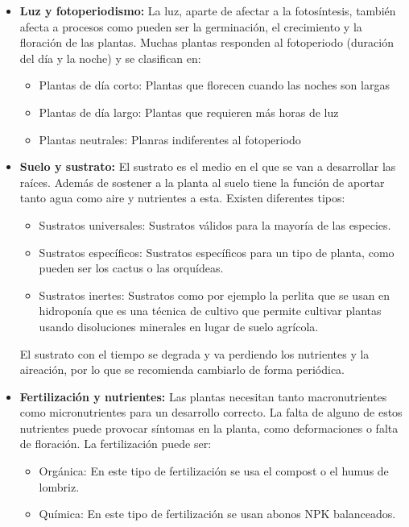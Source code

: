 \begin{itemize}
    \item \textbf{Luz y fotoperiodismo:} La luz, aparte de afectar a la fotosíntesis, también afecta a procesos como pueden ser la germinación, el crecimiento y la floración de las plantas. Muchas plantas responden al fotoperiodo (duración del día y la noche) y se clasifican en:
    \begin{itemize}
        \item {Plantas de día corto:} Plantas que florecen cuando las noches son largas
        \item {Plantas de día largo:} Plantas que requieren más horas de luz
        \item {Plantas neutrales:} Planras indiferentes al fotoperiodo
    \end{itemize}

    \item \textbf{Suelo y sustrato:} El sustrato es el medio en el que se van a desarrollar las raíces. Además de sostener a la planta al suelo tiene la función de aportar tanto agua como aire y nutrientes a esta. Existen diferentes tipos:
    \begin{itemize}
        \item {Sustratos universales:} Sustratos válidos para la mayoría de las especies.
        \item {Sustratos específicos:} Sustratos específicos para un tipo de planta, como pueden ser los cactus o las orquídeas.
        \item {Sustratos inertes:} Sustratos como por ejemplo la perlita que se usan en hidroponía que es una técnica de cultivo que permite cultivar plantas usando disoluciones minerales en lugar de suelo agrícola.
    \end{itemize}

    El sustrato con el tiempo se degrada y va perdiendo los nutrientes y la aireación, por lo que se recomienda cambiarlo de forma periódica.

    \item \textbf{Fertilización y nutrientes:} Las plantas necesitan tanto macronutrientes como micronutrientes para un desarrollo correcto. La falta de alguno de estos nutrientes puede provocar síntomas en la planta, como deformaciones o falta de floración.
    La fertilización puede ser:
    \begin{itemize}
        \item {Orgánica:} En este tipo de fertilización se usa el compost o el humus de lombriz.
        \item {Química:} En este tipo de fertilización se usan abonos NPK balanceados.
    \end{itemize}    
\end{itemize}








